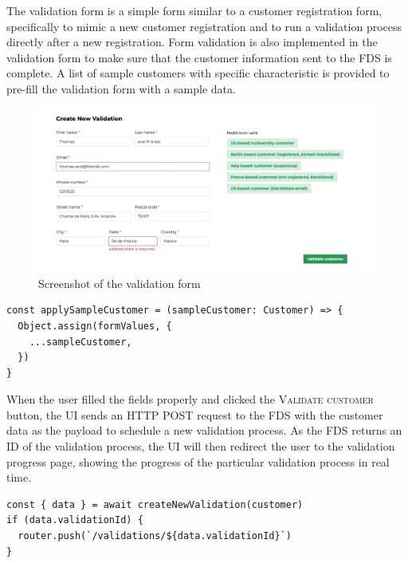     The validation form is a simple form similar to a customer registration form, specifically to mimic a new customer registration and to run a validation process directly after a new registration. Form validation is also implemented in the validation form to make sure that the customer information sent to the FDS is complete. A list of sample customers with specific characteristic is provided to pre-fill the validation form with a sample data. 

    \begin{figure}[!ht]
      \includegraphics[width=\textwidth]{images/ss_customer_form.jpeg}
      \caption{Screenshot of the validation form}
    \end{figure}

    \newpage
    \begin{lstlisting}[style=es6, caption={Prefilling form values with a sample customer data (TypeScript)}]
const applySampleCustomer = (sampleCustomer: Customer) => {
  Object.assign(formValues, {
    ...sampleCustomer,
  })
}
    \end{lstlisting}

    When the user filled the fields properly and clicked the \textsc{Validate customer} button, the UI sends an HTTP POST request to the FDS with the customer data as the payload to schedule a new validation process. As the FDS returns an ID of the validation process, the UI will then redirect the user to the validation progress page, showing the progress of the particular validation process in real time. 

    \begin{lstlisting}[style=es6, caption={Redirecting to the progress page when a validation process is scheduled successfully (TypeScript)}]
const { data } = await createNewValidation(customer)
if (data.validationId) {
  router.push(`/validations/${data.validationId}`)
}
    \end{lstlisting}


